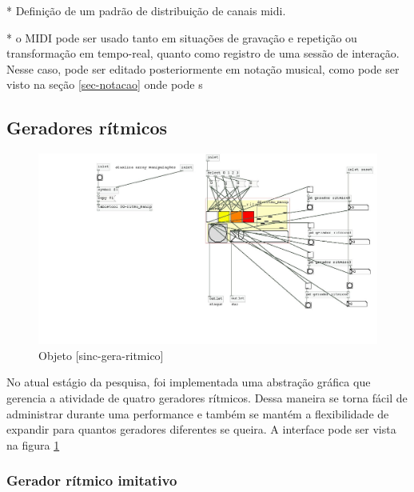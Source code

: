 \documentclass[draft]{ppgmus}
\begin{document}
* Definição de um padrão de distribuição de canais midi.

* o MIDI pode ser usado tanto em situações de gravação e repetição ou
transformação em tempo-real, quanto como registro de uma sessão de interação.
Nesse caso, pode ser editado posteriormente em notação musical, como pode ser
visto na seção \ref{sec-notacao} onde pode s


\subsection{Geradores rítmicos}






\begin{figure}
\includegraphics[scale=.5]{sinc-gera-ritmo}
\caption{Objeto [sinc-gera-ritmico]}
\label{[sinc-gera-ritmico]}
\end{figure}

No atual estágio da pesquisa, foi implementada uma abstração gráfica
que gerencia a atividade de quatro geradores rítmicos. Dessa
maneira se torna fácil de administrar durante uma performance
e também se mantém a flexibilidade de expandir para quantos
geradores diferentes se queira. A interface pode ser vista na figura \ref{[sinc-gera-ritmico]}


\subsubsection{Gerador rítmico imitativo}
\end{document}
